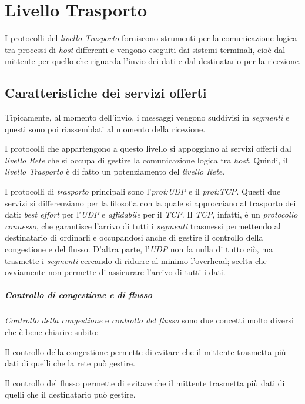 \chapter{Livello Trasporto}
I protocolli del \emph{livello Trasporto} forniscono strumenti per la
comunicazione logica tra processi di \emph{host} differenti e vengono eseguiti dai
sistemi terminali, cioè dal mittente per quello che riguarda l'invio dei dati e
dal destinatario per la ricezione.

\section{Caratteristiche dei servizi offerti}
Tipicamente, al momento dell'invio, i messaggi vengono suddivisi in \emph{segmenti}
e questi sono poi riassemblati al momento della ricezione.

I protocolli che appartengono a questo livello si appoggiano ai servizi
offerti dal \emph{livello Rete} che si occupa di gestire la comunicazione logica
tra \emph{host}. Quindi, il \emph{livello Trasporto} è di fatto un potenziamento del
\emph{livello Rete}.

\bigskip\noindent
I protocolli di \emph{trasporto} principali sono l'\emph{\gls{prot:UDP}} e il
\emph{\gls{prot:TCP}}. Questi due servizi si differenziano per la filosofia
con la quale si approcciano al trasporto dei dati: \emph{best effort} per
l'\emph{UDP} e \emph{affidabile} per il \emph{TCP}. Il \emph{TCP}, infatti, è
un \emph{protocollo connesso}, che garantisce l'arrivo di tutti i \emph{segmenti}
trasmessi permettendo al destinatario di ordinarli e occupandosi anche di gestire
il controllo della congestione e del flusso. D'altra parte, l'\emph{UDP} non
fa nulla di tutto ciò, ma trasmette i \emph{segmenti} cercando di ridurre al
minimo l'overhead; scelta che ovviamente non permette di assicurare l'arrivo
di tutti i dati.

\paragraph{Controllo di congestione e di flusso}
\emph{Controllo della congestione} e \emph{controllo del flusso} sono due
concetti molto diversi che è bene chiarire subito:
\begin{definition}
    Il controllo della congestione permette di evitare che il mittente
    trasmetta più dati di quelli che la rete può gestire.    
\end{definition}
\begin{definition}
    Il controllo del flusso permette di evitare che il mittente
    trasmetta più dati di quelli che il destinatario può gestire.
\end{definition}

